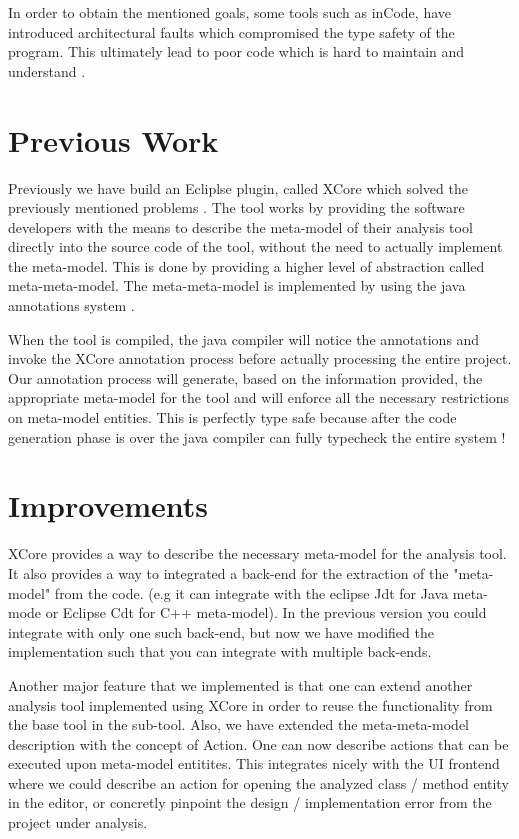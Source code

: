         In order to obtain the mentioned goals, some tools such as inCode\cite{tools:inCode}, have introduced architectural faults which compromised the type safety of the program. This
ultimately lead to poor code which is hard to maintain and understand \cite{oldThesis}.

\section{Previous Work}

        Previously we have build an Ecliplse plugin, called XCore which solved the previously mentioned problems \cite{oldThesis}. The tool works by providing the software developers with
the means to describe the meta-model of their analysis tool directly into the source code of the tool, without the need to actually implement the meta-model. This is done by providing a higher
level of abstraction called meta-meta-model. The meta-meta-model is implemented by using the java annotations system \cite{oldThesis} \cite{book:ThinkingInJava}.

        When the tool is compiled, the java compiler will notice the annotations and invoke the XCore annotation process before actually processing the entire project. Our annotation process
will generate, based on the information provided, the appropriate meta-model for the tool and will enforce all the necessary restrictions on meta-model entities. This is perfectly type safe
because after the code generation phase is over the java compiler can fully typecheck the entire system !
        
\section{Improvements}
        
        XCore provides  a way to describe the necessary meta-model for the analysis tool. It also provides a way to integrated a back-end for the extraction of the "meta-model" from the code.
(e.g it can integrate with the eclipse Jdt for Java meta-mode or Eclipse Cdt for C++ meta-model). In the previous version you could integrate with only one such back-end, but now we have
modified the implementation such that you can integrate with multiple back-ends. 

        Another major feature that we implemented is that one can extend another analysis tool implemented using XCore in order to reuse the functionality from the base tool in the sub-tool.
        Also, we have extended the meta-meta-model description with the concept of Action. One can now describe actions that can be executed upon meta-model entitites. This integrates nicely
with the UI frontend where we could describe an action for opening the analyzed class / method entity in the editor, or concretly pinpoint the design / implementation error from the project
under analysis.

